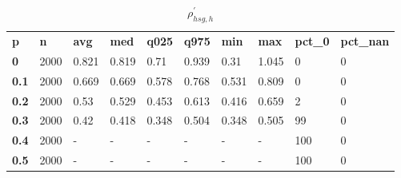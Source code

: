 \begin{table}[h]
 \centering 
\footnotesize
\caption{$\rho_{hsg,h}^\prime $}
\label{tab:alphahsgh}
\begin{tabular}[h]{| l l l l l l l l l l|
    } \hline
\textbf{ p} & \textbf{ n} & \textbf{ avg} & \textbf{ med} & \textbf{ q025} & \textbf{ q975} & \textbf{ min} & \textbf{ max} & \textbf{ pct\_0} & \textbf{ pct\_nan}
           \\
  \textbf{  0} & 2000 & 0.821 & 0.819 &  0.71 & 0.939 &  0.31 & 1.045 &   0 & 0
           \\
  \textbf{0.1} & 2000 & 0.669 & 0.669 & 0.578 & 0.768 & 0.531 & 0.809 &   0 & 0
           \\
  \textbf{0.2} & 2000 &  0.53 & 0.529 & 0.453 & 0.613 & 0.416 & 0.659 &   2 & 0
           \\
  \textbf{0.3} & 2000 &  0.42 & 0.418 & 0.348 & 0.504 & 0.348 & 0.505 &  99 & 0
           \\
  \textbf{0.4} & 2000 & - & - & - & - & - & - & 100 & 0
           \\
  \textbf{0.5} & 2000 & - & - & - & - & - & - & 100 & 0
           \\
 \hline \end{tabular}
 \end{table}
